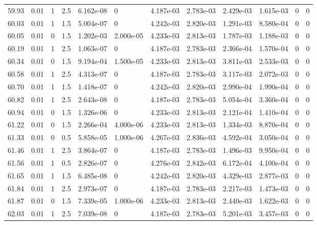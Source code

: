\documentclass[preview]{standalone}
\begin{document}
{{{{{{{{{\begin{tabular}{L{1.2cm}C{1.2cm} C{0.3cm}C{0.5cm} C{1.4cm}C{1.4cm} C{1.4cm}C{1.4cm} C{1.6cm}C{1.6cm} C{1.6cm}C{1.6cm}}
  59.93  &  0.01  & 1     & 2.5 &  6.162e-08  & 0  &  4.187e-03&   2.783e-03& 2.429e-03 & 1.615e-03   &  0 & 0  \\ 
  60.03  &  0.01  & 1     & 1.5 &  5.004e-07  & 0  &  4.242e-03&   2.820e-03& 1.291e-03 & 8.580e-04   &  0 & 0  \\ 
  60.05  &  0.01  & 0     & 1.5 &  1.202e-03  & 2.000e-05  &  4.233e-03&   2.813e-03& 1.787e-03 & 1.188e-03   &  0 & 0  \\ 
  60.19  &  0.01  & 1     & 2.5 &  1.063e-07  & 0  &  4.187e-03&   2.783e-03& 2.366e-04 & 1.570e-04   &  0 & 0  \\ 
  60.34  &  0.01  & 0     & 1.5 &  9.194e-04  & 1.500e-05  &  4.233e-03&   2.813e-03& 3.811e-03 & 2.533e-03   &  0 & 0  \\ 
  60.58  &  0.01  & 1     & 2.5 &  4.313e-07  & 0  &  4.187e-03&   2.783e-03& 3.117e-03 & 2.072e-03   &  0 & 0  \\ 
  60.70  &  0.01  & 1     & 1.5 &  1.418e-07  & 0  &  4.242e-03&   2.820e-03& 2.990e-04 & 1.990e-04   &  0 & 0  \\ 
  60.82  &  0.01  & 1     & 2.5 &  2.643e-08  & 0  &  4.187e-03&   2.783e-03& 5.054e-04 & 3.360e-04   &  0 & 0  \\ 
  60.94  &  0.01  & 0     & 1.5 &  1.326e-06  & 0  &  4.233e-03&   2.813e-03& 2.121e-04 & 1.410e-04   &  0 & 0  \\ 
  61.22  &  0.01  & 0     & 1.5 &  2.266e-04  & 4.000e-06  &  4.233e-03&   2.813e-03& 1.334e-03 & 8.870e-04   &  0 & 0  \\ 
  61.33  &  0.01  & 0     & 0.5 &  5.858e-05  & 1.000e-06  &  4.267e-03&   2.836e-03& 4.592e-04 & 3.050e-04   &  0 & 0  \\ 
  61.46  &  0.01  & 1     & 2.5 &  3.864e-07  & 0  &  4.187e-03&   2.783e-03& 1.496e-03 & 9.950e-04   &  0 & 0  \\ 
  61.56  &  0.01  & 1     & 0.5 &  2.826e-07  & 0  &  4.276e-03&   2.842e-03& 6.172e-04 & 4.100e-04   &  0 & 0  \\ 
  61.65  &  0.01  & 1     & 1.5 &  6.485e-08  & 0  &  4.242e-03&   2.820e-03& 4.329e-03 & 2.877e-03   &  0 & 0  \\ 
  61.84  &  0.01  & 1     & 2.5 &  2.973e-07  & 0  &  4.187e-03&   2.783e-03& 2.217e-03 & 1.473e-03   &  0 & 0  \\ 
  61.87  &  0.01  & 0     & 1.5 &  7.339e-05  & 1.000e-06  &  4.233e-03&   2.813e-03& 2.440e-03 & 1.622e-03   &  0 & 0  \\ 
  62.03  &  0.01  & 1     & 2.5 &  7.039e-08  & 0  &  4.187e-03&   2.783e-03& 5.201e-03 & 3.457e-03   &  0 & 0  \\ 

\end{tabular}}}}}}}}}}
\end{document}
